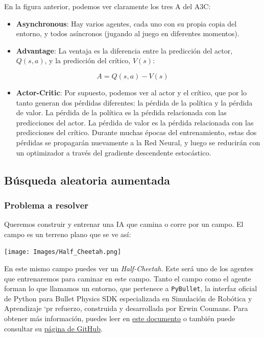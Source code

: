 \documentclass[]{book}
\providecommand{\tightlist}{%
  \setlength{\itemsep}{0pt}\setlength{\parskip}{0pt}}
\begin{document}
En la figura anterior, podemos ver claramente los tres A del A3C:

\begin{itemize}
\item
  \textbf{Asynchronous}: Hay varios agentes, cada uno con su propia copia del entorno, y todos asíncronos (jugando al juego en diferentes momentos).
\item
  \textbf{Advantage}: La ventaja es la diferencia entre la predicción del actor, \(Q(s, a)\), y la predicción del crítico, \(V(s)\):
\end{itemize}

\[A = Q(s,a) - V(s)\]

\begin{itemize}
\tightlist
\item
  \textbf{Actor-Critic}: Por supuesto, podemos ver al actor y el crítico, que por lo tanto generan dos pérdidas diferentes: la pérdida de la política y la pérdida de valor. La pérdida de la política es la pérdida relacionada con las predicciones del actor. La pérdida de valor es la pérdida relacionada con las predicciones del crítico. Durante muchas épocas del entrenamiento, estas dos pérdidas se propagarán nuevamente a la Red Neural, y luego se reducirán con un optimizador a través del gradiente descendente estocástico.
\end{itemize}

\hypertarget{buxfasqueda-aleatoria-aumentada}{%
\subsection{Búsqueda aleatoria aumentada}\label{buxfasqueda-aleatoria-aumentada}}

\hypertarget{problema-a-resolver-2}{%
\subsubsection{Problema a resolver}\label{problema-a-resolver-2}}

Queremos construir y entrenar una IA que camina o corre por un campo. El campo es un terreno plano que se ve así:

\texttt{[image: Images/Half\_Cheetah.png]}

En este mismo campo puedes ver un \emph{Half-Cheetah}. Este será uno de los agentes que entrenaremos para caminar en este campo. Tanto el campo como el agente forman lo que llamamos un entorno, que pertenece a \texttt{PyBullet}, la interfaz oficial de Python para Bullet Physics SDK especializada en Simulación de Robótica y Aprendizaje `pr refuerzo, construida y desarrollada por Erwin Coumans. Para obtener más información, puedes leer en \href{https://docs.google.com/document/d/10sXEhzFRSnvFcl3XxNGhnD4N2SedqwdAvK3dsihxVUA/edit}{este documento} o también puede consultar su \href{https://github.com/bulletphysics/bullet3}{página de GitHub}.
\end{document}
